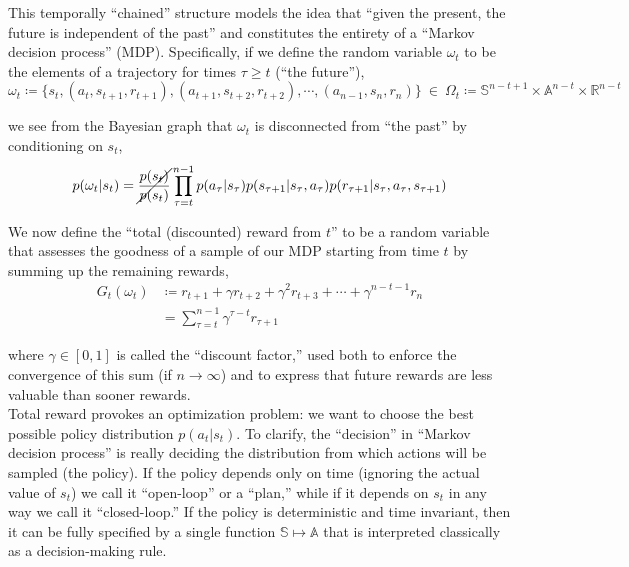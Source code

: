 This temporally ``chained'' structure models the idea that ``given the present, the future is independent of the past'' and constitutes the entirety of a ``Markov decision process'' (MDP). Specifically, if we define the random variable $\omega_t$ to be the elements of a trajectory for times $\tau \geq t$ (``the future''),
\begin{equation*}
\omega_t \coloneqq \{s_t, (a_t, s_{t+1}, r_{t+1}), (a_{t+1}, s_{t+2}, r_{t+2}), \cdots, (a_{n-1}, s_{n}, r_n)\} \ \in \ \Omega_t \coloneqq \mathbb{S}^{n-t+1} \times \mathbb{A}^{n-t} \times \mathbb{R}^{n-t}
\end{equation*}

we see from the Bayesian graph that $\omega_t$ is disconnected from ``the past'' by conditioning on $s_t$,
\begin{equation*}
p(\omega_t|s_t) = \cancel{\frac{p(s_t)}{p(s_t)}}\prod_{\tau=t}^{n-1} p(a_\tau|s_\tau)p(s_{\tau+1}|s_\tau,a_\tau)p(r_{\tau+1}|s_\tau,a_\tau,s_{\tau+1})
\end{equation*}

We now define the ``total (discounted) reward from $t$'' to be a random variable that assesses the goodness of a sample of our MDP starting from time $t$ by summing up the remaining rewards,
\begin{align*}
G_t(\omega_t) &\coloneqq r_{t+1} + \gamma r_{t+2} + \gamma^2 r_{t+3} + \cdots + \gamma^{n-t-1} r_n\\
&= \sum_{\tau=t}^{n-1} \gamma^{\tau-t} r_{\tau+1}
\end{align*}

where $\gamma \in [0,1]$ is called the ``discount factor,'' used both to enforce the convergence of this sum (if $n \to \infty$) and to express that future rewards are less valuable than sooner rewards.\\

Total reward provokes an optimization problem: we want to choose the best possible policy distribution $p(a_t|s_t)$. To clarify, the ``decision'' in ``Markov decision process'' is really deciding the distribution from which actions will be sampled (the policy). If the policy depends only on time (ignoring the actual value of $s_t$) we call it ``open-loop'' or a ``plan,'' while if it depends on $s_t$ in any way we call it ``closed-loop.'' If the policy is deterministic and time invariant, then it can be fully specified by a single function $\mathbb{S} \mapsto \mathbb{A}$ that is interpreted classically as a decision-making rule.\\

